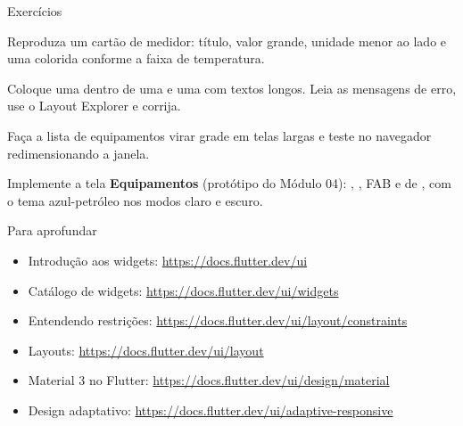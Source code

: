 \documentclass[aspectratio=169,10pt]{beamer}
\begin{document}
\begin{frame}{Exercícios}
  \begin{exercicio}
    Reproduza um cartão de medidor: título, valor grande, unidade menor ao lado e uma  colorida conforme a faixa de temperatura.
  \end{exercicio}
  \begin{exercicio}
    Coloque uma  dentro de uma  e uma  com textos longos. Leia as mensagens de erro, use o Layout Explorer e corrija.
  \end{exercicio}
  \begin{exercicio}
    Faça a lista de equipamentos virar grade em telas largas e teste no navegador redimensionando a janela.
  \end{exercicio}
  \begin{projeto}
    Implemente a tela \textbf{Equipamentos} (protótipo do Módulo 04): , , FAB e  de , com o tema azul-petróleo nos modos claro e escuro.
  \end{projeto}
\end{frame}

\begin{frame}{Para aprofundar}
  \small
  \begin{itemize}
    \item Introdução aos widgets: \url{https://docs.flutter.dev/ui}
    \item Catálogo de widgets: \url{https://docs.flutter.dev/ui/widgets}
    \item Entendendo restrições: \url{https://docs.flutter.dev/ui/layout/constraints}
    \item Layouts: \url{https://docs.flutter.dev/ui/layout}
    \item Material 3 no Flutter: \url{https://docs.flutter.dev/ui/design/material}
    \item Design adaptativo: \url{https://docs.flutter.dev/ui/adaptive-responsive}
  \end{itemize}
\end{frame}
\end{document}
